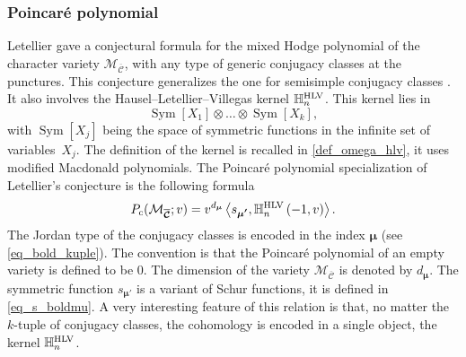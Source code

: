 \documentclass[JEP,XML,SOM,NoEqCountersInSection,Unicode,published]{cedram}
\newcommand{\rc}{\mathrm{c}}
\newcommand{\HLV}{\textup{HLV}}
\theoremstyle{definition}
\theoremstyle{plain}
\DeclareMathOperator{\SymF}{Sym}
\newcommand{\mcbar}{\mathcal{M}_{\boldsymbol{\overline{\mathcal{C}}}}}
\begin{document}
\subsubsection{Poincaré polynomial}
Letellier \cite{Letellier13} gave a conjectural formula for the mixed Hodge polynomial of the character variety $\mathcal{M}_{\boldsymbol{\overline{\mathcal{C}}}}$, with any type of generic conjugacy classes at the punctures. This conjecture generalizes the one for semisimple conjugacy classes \cite{Hausel_Letellier_Villegas}. It also involves the Hausel--Letellier--Villegas kernel $\mathbb{H}_n^{\HLV}$. This kernel lies in
\[
\SymF\left[X_1\right]\otimes \dots \otimes \SymF\left[X_k\right],
\]
with $\SymF\left[X_j\right]$ being the space of symmetric functions in the infinite set of variables~$X_j$. The definition of the kernel is recalled in \ref{def_omega_hlv}, it uses modified Macdonald polynomials. The Poincaré polynomial specialization of Letellier's conjecture is the following formula
\begin{equation}\label{eq_poincare_intro}
P_{\rc}(\mcbar; v) = v^{d_{\boldsymbol{\mu}}} \left\langle s_{\boldsymbol{\mu'}}, \mathbb{H}_n^{\HLV}\left(-1,v\right)\right\rangle.
\end{equation}
The Jordan type of the conjugacy classes is encoded in the index $\boldsymbol{\mu}$ (see \eqref{eq_bold_kuple}). The convention is that the Poincaré polynomial of an empty variety is defined to be $0$. The dimension of the variety $\mcbar$ is denoted by $d_{\boldsymbol{\mu}}$. The symmetric function $s_{\boldsymbol{\mu'}}$ is a variant of Schur functions, it is defined in \eqref{eq_s_boldmu}. A very interesting feature of this relation is that, no matter the $k$-tuple of conjugacy classes, the cohomology is encoded in a single object, the kernel $\mathbb{H}_n^{\HLV}$.
\end{document}

